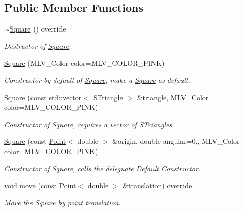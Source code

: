 \subsection*{Public Member Functions}
\begin{DoxyCompactItemize}
\item 
\mbox{\label{classSquare_ab0677a46d02aa78bc0b7be8c06f9dc37}} 
\hyperlink{classSquare_ab0677a46d02aa78bc0b7be8c06f9dc37}{$\sim$\+Square} () override
\begin{DoxyCompactList}\small\item\em Destructor of \hyperlink{classSquare}{Square}. \end{DoxyCompactList}\item 
\hyperlink{classSquare_aceff50017f5950b32a967a690213a26e}{Square} (M\+L\+V\+\_\+\+Color color=M\+L\+V\+\_\+\+C\+O\+L\+O\+R\+\_\+\+P\+I\+NK)
\begin{DoxyCompactList}\small\item\em Constructor by default of \hyperlink{classSquare}{Square}, make a \hyperlink{classSquare}{Square} as default. \end{DoxyCompactList}\item 
\hyperlink{classSquare_a6ac91ab99424771ac70670c7973c3f74}{Square} (const std\+::vector$<$ \hyperlink{classSTriangle}{S\+Triangle} $>$ \&triangle, M\+L\+V\+\_\+\+Color color=M\+L\+V\+\_\+\+C\+O\+L\+O\+R\+\_\+\+P\+I\+NK)
\begin{DoxyCompactList}\small\item\em Constructor of \hyperlink{classSquare}{Square}, requires a vector of S\+Triangles. \end{DoxyCompactList}\item 
\hyperlink{classSquare_a80828d5c491e3d76ea4707ddd42685cd}{Square} (const \hyperlink{classPoint}{Point}$<$ double $>$ \&origin, double angular=0., M\+L\+V\+\_\+\+Color color=M\+L\+V\+\_\+\+C\+O\+L\+O\+R\+\_\+\+P\+I\+NK)
\begin{DoxyCompactList}\small\item\em Constructor of \hyperlink{classSquare}{Square}, calls the deleguate Default Constructor. \end{DoxyCompactList}\item 
void \hyperlink{classSquare_a75b2fd22fc3895b83bc20728afb20b10}{move} (const \hyperlink{classPoint}{Point}$<$ double $>$ \&translation) override
\begin{DoxyCompactList}\small\item\em Move the \hyperlink{classSquare}{Square} by point translation. \end{DoxyCompactList}\item 

\end{DoxyCompactItemize}
